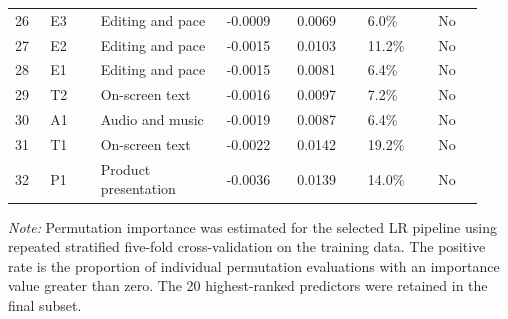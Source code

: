 \documentclass[10pt,a4paper]{article}
\begin{document}
\begin{landscape}
\begin{longtable}{@{}C{0.07\linewidth}C{0.10\linewidth}L{0.25\linewidth}C{0.14\linewidth}C{0.14\linewidth}C{0.14\linewidth}C{0.09\linewidth}@{}}
26 & E3 & Editing and pace & -0.0009 & 0.0069 & 6.0\% & No \\
27 & E2 & Editing and pace & -0.0015 & 0.0103 & 11.2\% & No \\
28 & E1 & Editing and pace & -0.0015 & 0.0081 & 6.4\% & No \\
29 & T2 & On-screen text & -0.0016 & 0.0097 & 7.2\% & No \\
30 & A1 & Audio and music & -0.0019 & 0.0087 & 6.4\% & No \\
31 & T1 & On-screen text & -0.0022 & 0.0142 & 19.2\% & No \\
32 & P1 & Product presentation & -0.0036 & 0.0139 & 14.0\% & No \\
\end{longtable}
\noindent\textit{Note:} Permutation importance was estimated for the selected LR pipeline using repeated stratified five-fold cross-validation on the training data. The positive rate is the proportion of individual permutation evaluations with an importance value greater than zero. The 20 highest-ranked predictors were retained in the final subset.\par
\end{landscape}
\end{document}
